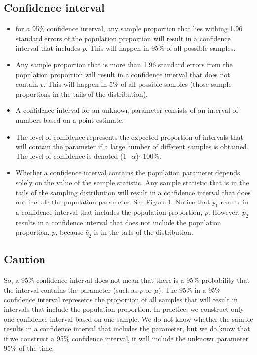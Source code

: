 \documentclass{report}
\begin{document}
        \pagebreak 
        \subsection*{Confidence interval}
        \bigbreak \noindent 
        \begin{itemize}
          \item for a 95\% confidence interval, any sample proportion that lies withing 1.96 standard errors of the population proportion will result in a confidence interval that includes $p $. This will happen in 95\% of all possible samples.
          \item Any sample proportion that is more than 1.96 standard errors from the population proportion will result in a confidence interval that does not contain $p $. This will happen in 5\% of all possible samples (those sample proportions in the tails of the distribution).
          \item A confidence interval for an unknown parameter consists of an interval of numbers based on a point estimate.
          \item The level of confidence represents the expected proportion of intervals that will contain the parameter if a large number of different samples is obtained. The level of confidence is denoted (1−$\alpha $)$\cdot $ 100\%.
          \item Whether a confidence interval contains the population parameter depends solely on the value of the sample statistic. Any sample statistic that is in the tails of the sampling distribution will result in a confidence interval that does not include the population parameter. See Figure 1. Notice that $\hat{p}_1$ results in a confidence interval that includes the population proportion, $p$. However, $\hat{p}_2$ results in a confidence interval that does not include the population proportion, $p$, because $\hat{p}_2$ is in the tails of the distribution.
        \end{itemize}

        \subsection*{Caution}
        \bigbreak \noindent 
        So, a 95\% confidence interval does not mean that there is a 95\% probability that the interval contains the parameter (such as $p $ or $\mu$). The 95\% in a 95\% confidence interval represents the proportion of all samples that will result in intervals that include the population proportion.
        \bigbreak \noindent 
        In practice, we construct only one confidence interval based on one sample. We do not know whether the sample results in a confidence interval that includes the parameter, but we do know that if we construct a 95\% confidence interval, it will include the unknown parameter 95\% of the time.
\end{document}
